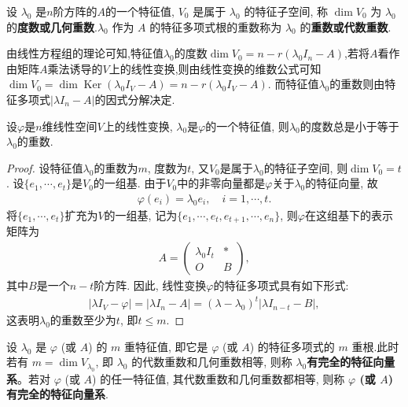 \documentclass[../../main.tex]{subfiles}%
\begin{document}
\begin{definition}[矩阵的几何重数与代数重数]
设 $\lambda_0$ 是$n$阶方阵的$A$的一个特征值, $V_0$ 是属于 $\lambda_0$ 的特征子空间, 称 $\dim V_0$ 为 $\lambda_0$ 的\textbf{度数或几何重数}.$\lambda_0$ 作为 $A$ 的特征多项式根的重数称为 $\lambda_0$ 的\textbf{重数或代数重数}.
\end{definition}
\begin{note}
由线性方程组的理论可知,特征值$\lambda_0$的度数$\dim V_0  = n - r(\lambda_0 I_n - A)$,若将$A$看作由矩阵$A$乘法诱导的$V$上的线性变换,则由线性变换的维数公式可知$\dim V_0  =\dim \operatorname{Ker}(\lambda_0 I_V - A)= n - r(\lambda_0 I_V - A)$.
而特征值$\lambda_0$的重数则由特征多项式$|\lambda I_n - A|$的因式分解决定.
\end{note}

\begin{lemma}[特征值的几何重数数总小于代数重数]\label{lemma:特征值的度数总小于重数}
设$\varphi$是$n$维线性空间$V$上的线性变换, $\lambda_0$是$\varphi$的一个特征值, 则$\lambda_0$的度数总是小于等于$\lambda_0$的重数.
\end{lemma}
\begin{proof}
设特征值$\lambda_0$的重数为$m$, 度数为$t$, 又$V_0$是属于$\lambda_0$的特征子空间, 则$\dim V_0 = t$. 设$\{e_1, \cdots, e_t\}$是$V_0$的一组基. 由于$V_0$中的非零向量都是$\varphi$关于$\lambda_0$的特征向量, 故
\begin{align*}
\varphi(e_i) = \lambda_0 e_i, \quad i = 1, \cdots, t.
\end{align*}
将$\{e_1, \cdots, e_t\}$扩充为$V$的一组基, 记为$\{e_1, \cdots, e_t, e_{t+1}, \cdots, e_n\}$, 则$\varphi$在这组基下的表示矩阵为
\begin{align*}
A = \begin{pmatrix}
\lambda_0 I_t & * \\
O & B
\end{pmatrix},
\end{align*}
其中$B$是一个$n-t$阶方阵. 因此, 线性变换$\varphi$的特征多项式具有如下形式:
\begin{align*}
|\lambda I_V - \varphi| = |\lambda I_n - A| = (\lambda - \lambda_0)^t |\lambda I_{n-t} - B|,
\end{align*}
这表明$\lambda_0$的重数至少为$t$, 即$t \leqslant  m$.
\end{proof}

\begin{definition}[完全的特征向量系]
设 $\lambda_0$ 是 $\varphi$ (或 $A$) 的 $m$ 重特征值, 即它是 $\varphi$ (或 $A$) 的特征多项式的 $m$ 重根.此时若有 $m = \dim V_{\lambda_0}$, 即 $\lambda_0$ 的代数重数和几何重数相等, 则称  \textbf{$\lambda_0$有完全的特征向量系}。若对 $\varphi$ (或 $A$) 的任一特征值, 其代数重数和几何重数都相等, 则称  \textbf{$\varphi$ (或 $A$) 有完全的特征向量系}.
\end{definition}
\end{document}
